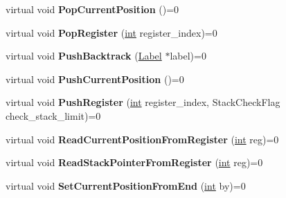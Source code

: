 \begin{DoxyCompactItemize}
virtual void {\bfseries Pop\+Current\+Position} ()=0
\item 
\mbox{\label{classv8_1_1internal_1_1RegExpMacroAssembler_accf76e0091230e0e29f58bed22826fcb}} 
virtual void {\bfseries Pop\+Register} (\mbox{\hyperlink{classint}{int}} register\+\_\+index)=0
\item 
\mbox{\label{classv8_1_1internal_1_1RegExpMacroAssembler_a3c79da20c15da3339defb598cdaeb45e}} 
virtual void {\bfseries Push\+Backtrack} (\mbox{\hyperlink{classv8_1_1internal_1_1Label}{Label}} $\ast$label)=0
\item 
\mbox{\label{classv8_1_1internal_1_1RegExpMacroAssembler_a96c21dc359474e6db50893c0b8fea4fe}} 
virtual void {\bfseries Push\+Current\+Position} ()=0
\item 
\mbox{\label{classv8_1_1internal_1_1RegExpMacroAssembler_a2d225e3c6813a1f170ae2aeb48898490}} 
virtual void {\bfseries Push\+Register} (\mbox{\hyperlink{classint}{int}} register\+\_\+index, Stack\+Check\+Flag check\+\_\+stack\+\_\+limit)=0
\item 
\mbox{\label{classv8_1_1internal_1_1RegExpMacroAssembler_a810b1e8b1bf498658765a4d3358b8ead}} 
virtual void {\bfseries Read\+Current\+Position\+From\+Register} (\mbox{\hyperlink{classint}{int}} reg)=0
\item 
\mbox{\label{classv8_1_1internal_1_1RegExpMacroAssembler_a9da08910342d85b0ae9b444d9dd9a443}} 
virtual void {\bfseries Read\+Stack\+Pointer\+From\+Register} (\mbox{\hyperlink{classint}{int}} reg)=0
\item 
\mbox{\label{classv8_1_1internal_1_1RegExpMacroAssembler_a7bd6e918db0bc938c5d26728c63b0b46}} 
virtual void {\bfseries Set\+Current\+Position\+From\+End} (\mbox{\hyperlink{classint}{int}} by)=0
\item 
\mbox{\label{classv8_1_1internal_1_1RegExpMacroAssembler_a545e20d50385d80782124f3562907417}} 

\end{DoxyCompactItemize}
